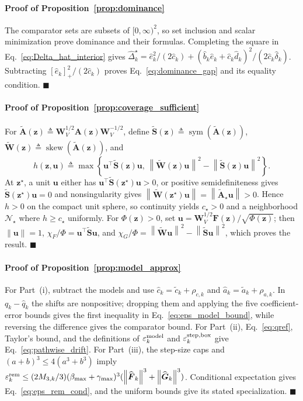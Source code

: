 \documentclass[journal]{IEEEtran}
\theoremstyle{remark}
\newcommand{\norm}[1]{\left\lVert #1\right\rVert}
\newcommand{\sym}{\operatorname{sym}}
\newcommand{\skewop}{\operatorname{skew}}
\newcommand{\cN}{\mathcal{N}}
\newcommand{\bz}{\boldsymbol{z}}
\newcommand{\bu}{\boldsymbol{u}}
\newcommand{\bW}{\boldsymbol{W}}
\newcommand{\bS}{\boldsymbol{S}}
\newcommand{\bA}{\boldsymbol{A}}
\newcommand{\bF}{\boldsymbol{F}}
\newcommand{\hatF}{\widehat{\boldsymbol{F}}}
\newcommand{\hatG}{\widehat{\boldsymbol{G}}}
\begin{document}
	\paragraph{Proof of Proposition~\ref{prop:dominance}}\label{app:dominance}
	The comparator sets are subsets of $[0,\infty)^2$, so set inclusion and scalar minimization prove dominance and their formulas.
	Completing the square in Eq.~\eqref{eq:Delta_hat_interior} gives $\widehat\Delta_k^\star=\hat e_k^2/(2\hat c_k)+ (\hat b_k\hat e_k+\hat c_k\hat d_k)^2/(2\hat c_k\hat\delta_k)$.
	Subtracting $[\hat e_k]_+^2/(2\hat c_k)$ proves Eq.~\eqref{eq:dominance_gap} and its equality condition.
	\hfill$\blacksquare$
	
	\paragraph{Proof of Proposition~\ref{prop:coverage_sufficient}}\label{app:coverage_sufficient}
	For $\widetilde{\bA}(\bz)\triangleq\bW_V^{1/2}\bA(\bz)\bW_V^{-1/2}$, define $\widetilde{\bS}(\bz)\triangleq\sym(\widetilde{\bA}(\bz))$, $\widetilde{\bW}(\bz)\triangleq\skewop(\widetilde{\bA}(\bz))$, and
	\[
	h(\bz,\bu)\triangleq\max\!\left\{\bu^\top\widetilde{\bS}(\bz)\bu,\,\norm{\widetilde{\bW}(\bz)\bu}^2-\norm{\widetilde{\bS}(\bz)\bu}^2\right\}.
	\]
	At $\bz^\star$, a unit $\bu$ either has $\bu^\top\widetilde{\bS}(\bz^\star)\bu>0$, or positive semidefiniteness gives $\widetilde{\bS}(\bz^\star)\bu=0$ and nonsingularity gives $\norm{\widetilde{\bW}(\bz^\star)\bu}=\norm{\widetilde{\bA}_\star\bu}>0$.
	Hence $h>0$ on the compact unit sphere, so continuity yields $c_\star>0$ and a neighborhood $\cN_\star$ where $h\ge c_\star$ uniformly.
	For $\Phi(\bz)>0$, set $\bu=\bW_V^{1/2}\bF(\bz)/\sqrt{\Phi(\bz)}$; then $\norm{\bu}=1$, $\chi_F/\Phi=\bu^\top\widetilde{\bS}\bu$, and $\chi_G/\Phi=\norm{\widetilde{\bW}\bu}^{2}-\norm{\widetilde{\bS}\bu}^{2}$, which proves the result.
	\hfill$\blacksquare$
	
	\paragraph{Proof of Proposition~\ref{prop:model_approx}}\label{app:model_approx}
	For Part~(i), subtract the models and use $\hat c_k=\tilde c_k+\rho_{c,k}$ and $\hat a_k=\tilde a_k+\rho_{a,k}$.
	In $q_k-\hat q_k$ the shifts are nonpositive; dropping them and applying the five coefficient-error bounds gives the first inequality in Eq.~\eqref{eq:eps_model_bound}, while reversing the difference gives the comparator bound.
	For Part~(ii), Eq.~\eqref{eq:qref}, Taylor's bound, and the definitions of $\varepsilon_k^{\rm model}$ and $\varepsilon_k^{\rm step,box}$ give Eq.~\eqref{eq:pathwise_drift}.
	For Part~(iii), the step-size caps and $(a+b)^3\le4(a^3+b^3)$ imply $\varepsilon_k^{\rm rem}\le(2M_{3,k}/3)(\beta_{\max}+\gamma_{\max})^3 (\norm{\hatF_k}^3+\norm{\hatG_k}^3)$.
	Conditional expectation gives Eq.~\eqref{eq:eps_rem_cond}, and the uniform bounds give its stated specialization.
	\hfill$\blacksquare$
	
\end{document}
